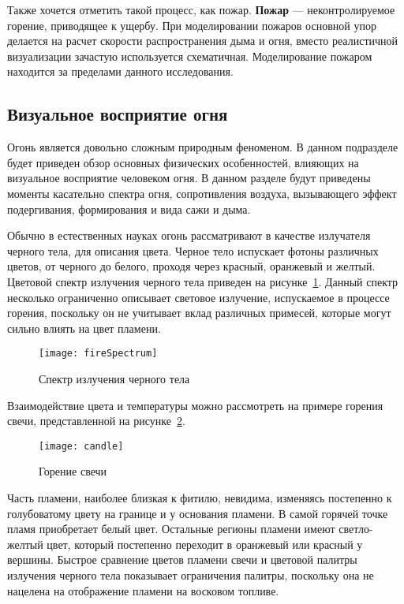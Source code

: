 Также хочется отметить такой процесс, как пожар. \textbf{Пожар} ---
неконтролируемое горение, приводящее к ущербу. При моделировании пожаров
основной упор делается на расчет скорости распространения дыма и огня, вместо
реалистичной визуализации зачастую используется схематичная. Моделирование
пожаром находится за пределами данного исследования.

\subsection{Визуальное восприятие огня}%
\label{section:firePerception}

Огонь является довольно сложным природным феноменом. В данном подразделе будет
приведен обзор основных физических особенностей, влияющих на визуальное
восприятие человеком огня. В данном разделе будут приведены моменты касательно
спектра огня, сопротивления воздуха, вызывающего эффект подергивания,
формирования и вида сажи и дыма.

Обычно в естественных науках огонь рассматривают в качестве излучателя черного
тела, для описания цвета. Черное тело испускает фотоны различных цветов, от
черного до белого, проходя через красный, оранжевый и желтый. Цветовой спектр
излучения черного тела приведен на рисунке~\ref{fig:fireSpectrum}. Данный спектр
несколько ограниченно описывает световое излучение, испускаемое в процессе
горения, поскольку он не учитывает вклад различных примесей, которые могут
сильно влиять на цвет пламени.
\begin{figure}[htb]
	\centering
    \texttt{[image: fireSpectrum]}
	\caption{Спектр излучения черного тела}%
    \label{fig:fireSpectrum}
\end{figure}

Взаимодействие цвета и температуры можно рассмотреть на примере горения свечи,
представленной на рисунке~\ref{fig:candle}.
\begin{figure}[htb]
	\centering
    \texttt{[image: candle]}
	\caption{Горение свечи}%
    \label{fig:candle}
\end{figure}
Часть пламени, наиболее близкая к фитилю, невидима, изменяясь постепенно к
голубоватому цвету на границе и у основания пламени. В самой горячей точке пламя
приобретает белый цвет. Остальные регионы пламени имеют светло-желтый цвет,
который постепенно переходит в оранжевый или красный у вершины. Быстрое
сравнение цветов пламени свечи и цветовой палитры излучения черного тела
показывает ограничения палитры, поскольку она не нацелена на отображение пламени
на восковом топливе.

